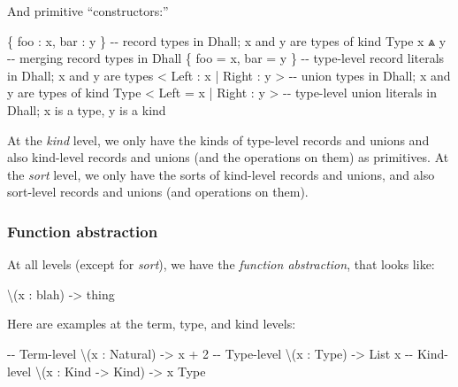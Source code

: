 \documentclass[]{article}
\newenvironment{Shaded}{}{}
\newcommand{\NormalTok}[1]{#1}
\begin{document}
And primitive ``constructors:''

\begin{Shaded}
\begin{Highlighting}[]
\NormalTok{\{ foo : x, bar : y \}       {-}{-} record types in Dhall; x and y are types of kind Type}
\NormalTok{x ⩓ y                      {-}{-} merging record types in Dhall}
\NormalTok{\{ foo = x, bar = y \}       {-}{-} type{-}level record literals in Dhall; x and y are types}
\NormalTok{\textless{} Left : x | Right : y \textgreater{}   {-}{-} union types in Dhall; x and y are types of kind Type}
\NormalTok{\textless{} Left = x | Right : y \textgreater{}   {-}{-} type{-}level union literals in Dhall; x is a type, y is a kind}
\end{Highlighting}
\end{Shaded}

At the \emph{kind} level, we only have the kinds of type-level records and
unions and also kind-level records and unions (and the operations on them) as
primitives. At the \emph{sort} level, we only have the sorts of kind-level
records and unions, and also sort-level records and unions (and operations on
them).

\subsubsection{Function abstraction}\label{function-abstraction}

At all levels (except for \emph{sort}), we have the \emph{function abstraction},
that looks like:

\begin{Shaded}
\begin{Highlighting}[]
\NormalTok{\textbackslash{}(x : blah) {-}\textgreater{} thing}
\end{Highlighting}
\end{Shaded}

Here are examples at the term, type, and kind levels:

\begin{Shaded}
\begin{Highlighting}[]
\NormalTok{{-}{-} Term{-}level}
\NormalTok{\textbackslash{}(x : Natural) {-}\textgreater{} x + 2}
\NormalTok{{-}{-} Type{-}level}
\NormalTok{\textbackslash{}(x : Type) {-}\textgreater{} List x}
\NormalTok{{-}{-} Kind{-}level}
\NormalTok{\textbackslash{}(x : Kind {-}\textgreater{} Kind) {-}\textgreater{} x Type}
\end{Highlighting}
\end{Shaded}
\end{document}
